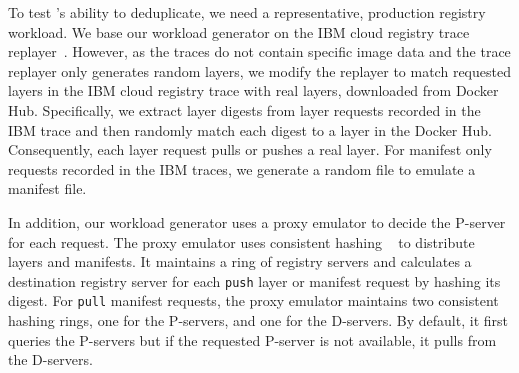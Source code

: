 To test \sysname{}'s ability to deduplicate, we need a representative, production
registry workload.
%
We base our workload generator on the IBM cloud registry trace replayer~\cite{dockerworkload}.
%
However, as the traces do not contain specific image data and the trace
replayer only generates random layers, we modify the replayer
to match requested layers in the IBM cloud registry trace with
real layers, downloaded from Docker Hub.
%
Specifically, we extract layer digests from layer requests recorded in the IBM trace
and then randomly match each digest to a layer in the Docker Hub.
Consequently, each layer request pulls or pushes a real layer.
%
For manifest only requests recorded in the IBM traces, we generate a random file to emulate a
manifest file.

In addition, our workload generator uses a proxy emulator to decide
the P-server for each request.
%
The proxy emulator uses
consistent hashing ~\cite{kargercons} to distribute layers and manifests.
%
It maintains a ring of registry servers
and calculates a destination registry server for each \texttt{push} layer or manifest request
by hashing its digest.
%
For \texttt{pull} manifest requests, the proxy emulator maintains two consistent hashing rings,
one for the P-servers, and one for the D-servers.
%
By default, it first queries the P-servers but if the requested P-server is not available,
it pulls from the D-servers.

